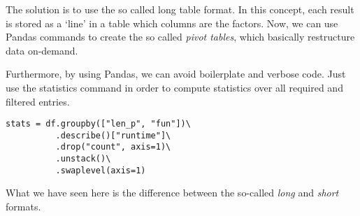 The solution is to use the so called long table format.
In this concept, each result is stored as a `line'
in a table which columns are the factors.
Now, we can use Pandas commands to create the so called \emph{pivot tables},
which basically restructure data on-demand.

Furthermore, by using Pandas, we can avoid boilerplate and verbose code.
Just use the statistics command in order to compute statistics over all required
and filtered entries.


\begin{lstlisting}
stats = df.groupby(["len_p", "fun"])\
          .describe()["runtime"]\
          .drop("count", axis=1)\
          .unstack()\
          .swaplevel(axis=1)
\end{lstlisting}

What we have seen here is the difference between the so-called \emph{long}
and \emph{short} formats.
